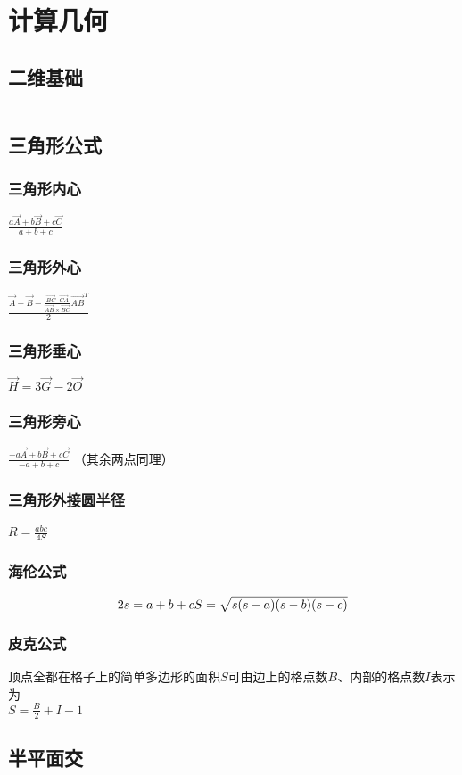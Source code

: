 \section{计算几何}
\subsection{二维基础}
\inputminted[breaklines]{cpp}{./computational_geometry/two_dimensions_basic.cpp}
\subsection{三角形公式}
	\subsubsection{三角形内心}
	$\frac{a \vec{A} + b \vec{B} + c \vec{C}}{a + b + c}$
	\subsubsection{三角形外心}
	$\frac{\vec{A} + \vec{B} - \frac{\vec{BC} \cdot \vec{CA}}{\vec{AB} \times \vec{BC}} \vec{AB}^T}{2}$
	\subsubsection{三角形垂心}
	$\vec{H} = 3 \vec{G} - 2 \vec{O}$
	\subsubsection{三角形旁心}
	$\frac{-a \vec{A} + b \vec{B} + c \vec{C}}{-a + b + c}$ （其余两点同理）
	\subsubsection{三角形外接圆半径}
	$R = \frac{abc}{4S}$
	\subsubsection{海伦公式}
	$$
	2s = a + b + c \\
	S = \sqrt{s(s - a)(s - b)(s - c)}
	$$
	\subsubsection{皮克公式}
	顶点全都在格子上的简单多边形的面积$S$可由边上的格点数$B$、内部的格点数$I$表示为 \\
	$S = \frac{B}{2} + I - 1$
\subsection{半平面交}
\inputminted[breaklines]{cpp}{./computational_geometry/half_plane_intersection.cpp}
